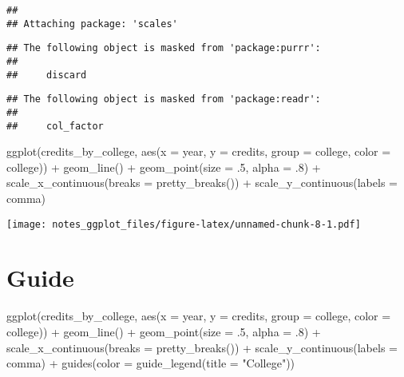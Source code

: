\documentclass[
]{book}
\newenvironment{Shaded}{\begin{snugshade}}{\end{snugshade}}
\newcommand{\AttributeTok}[1]{\textcolor[rgb]{0.77,0.63,0.00}{#1}}
\newcommand{\DecValTok}[1]{\textcolor[rgb]{0.00,0.00,0.81}{#1}}
\newcommand{\FunctionTok}[1]{\textcolor[rgb]{0.00,0.00,0.00}{#1}}
\newcommand{\NormalTok}[1]{#1}
\newcommand{\SpecialCharTok}[1]{\textcolor[rgb]{0.00,0.00,0.00}{#1}}
\newcommand{\StringTok}[1]{\textcolor[rgb]{0.31,0.60,0.02}{#1}}
\begin{document}
\begin{verbatim}
## 
## Attaching package: 'scales'
\end{verbatim}

\begin{verbatim}
## The following object is masked from 'package:purrr':
## 
##     discard
\end{verbatim}

\begin{verbatim}
## The following object is masked from 'package:readr':
## 
##     col_factor
\end{verbatim}

\begin{Shaded}
\begin{Highlighting}[]
\FunctionTok{ggplot}\NormalTok{(credits\_by\_college, }\FunctionTok{aes}\NormalTok{(}\AttributeTok{x =}\NormalTok{ year, }\AttributeTok{y =}\NormalTok{ credits, }\AttributeTok{group =}\NormalTok{ college, }\AttributeTok{color =}\NormalTok{ college)) }\SpecialCharTok{+} 
  \FunctionTok{geom\_line}\NormalTok{() }\SpecialCharTok{+} \FunctionTok{geom\_point}\NormalTok{(}\AttributeTok{size =}\NormalTok{ .}\DecValTok{5}\NormalTok{, }\AttributeTok{alpha =}\NormalTok{ .}\DecValTok{8}\NormalTok{) }\SpecialCharTok{+}
  \FunctionTok{scale\_x\_continuous}\NormalTok{(}\AttributeTok{breaks =} \FunctionTok{pretty\_breaks}\NormalTok{()) }\SpecialCharTok{+}
  \FunctionTok{scale\_y\_continuous}\NormalTok{(}\AttributeTok{labels =}\NormalTok{ comma)}
\end{Highlighting}
\end{Shaded}

\texttt{[image: notes\_ggplot\_files/figure-latex/unnamed-chunk-8-1.pdf]}

\hypertarget{guide}{%
\section{Guide}\label{guide}}

\begin{Shaded}
\begin{Highlighting}[]
\FunctionTok{ggplot}\NormalTok{(credits\_by\_college, }\FunctionTok{aes}\NormalTok{(}\AttributeTok{x =}\NormalTok{ year, }\AttributeTok{y =}\NormalTok{ credits, }\AttributeTok{group =}\NormalTok{ college, }\AttributeTok{color =}\NormalTok{ college)) }\SpecialCharTok{+} 
  \FunctionTok{geom\_line}\NormalTok{() }\SpecialCharTok{+} \FunctionTok{geom\_point}\NormalTok{(}\AttributeTok{size =}\NormalTok{ .}\DecValTok{5}\NormalTok{, }\AttributeTok{alpha =}\NormalTok{ .}\DecValTok{8}\NormalTok{) }\SpecialCharTok{+}
  \FunctionTok{scale\_x\_continuous}\NormalTok{(}\AttributeTok{breaks =} \FunctionTok{pretty\_breaks}\NormalTok{()) }\SpecialCharTok{+}
  \FunctionTok{scale\_y\_continuous}\NormalTok{(}\AttributeTok{labels =}\NormalTok{ comma) }\SpecialCharTok{+}
  \FunctionTok{guides}\NormalTok{(}\AttributeTok{color =} \FunctionTok{guide\_legend}\NormalTok{(}\AttributeTok{title =} \StringTok{"College"}\NormalTok{))}
\end{Highlighting}
\end{Shaded}
\end{document}
